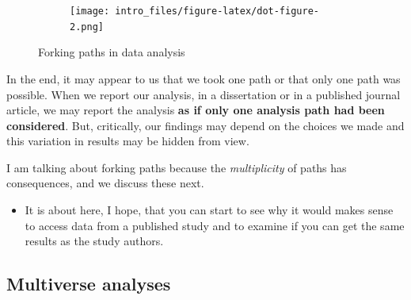 \documentclass[
  letterpaper,
  DIV=11,
  numbers=noendperiod]{scrreprt}
\providecommand{\tightlist}{%
  \setlength{\itemsep}{0pt}\setlength{\parskip}{0pt}}\usepackage{longtable,booktabs,array}
\begin{document}
\begin{figure}

{\centering 

\begin{figure}[H]

{\centering \texttt{[image: intro\_files/figure-latex/dot-figure-2.png]}

}

\end{figure}

}

\caption{\label{fig-forking}Forking paths in data analysis}

\end{figure}

In the end, it may appear to us that we took one path or that only one
path was possible. When we report our analysis, in a dissertation or in
a published journal article, we may report the analysis \textbf{as if
only one analysis path had been considered}. But, critically, our
findings may depend on the choices we made and this variation in results
may be hidden from view.

I am talking about forking paths because the \emph{multiplicity} of
paths has consequences, and we discuss these next.

\begin{tcolorbox}[enhanced jigsaw, opacitybacktitle=0.6, title=\textcolor{quarto-callout-tip-color}{\faLightbulb}\hspace{0.5em}{Tip}, arc=.35mm, colbacktitle=quarto-callout-tip-color!10!white, colframe=quarto-callout-tip-color-frame, leftrule=.75mm, opacityback=0, breakable, titlerule=0mm, left=2mm, bottomrule=.15mm, toprule=.15mm, colback=white, coltitle=black, bottomtitle=1mm, toptitle=1mm, rightrule=.15mm]

\begin{itemize}
\tightlist
\item
  It is about here, I hope, that you can start to see why it would makes
  sense to access data from a published study and to examine if you can
  get the same results as the study authors.
\end{itemize}

\end{tcolorbox}

\hypertarget{sec-multiverse}{%
\subsection{Multiverse analyses}\label{sec-multiverse}}
\end{document}
